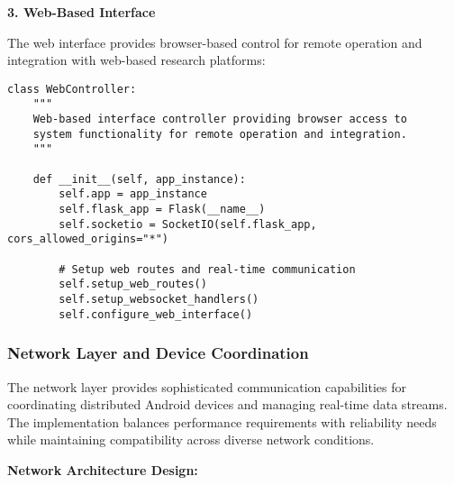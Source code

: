 \documentclass[12pt,a4paper]{article}
\begin{document}
\textbf{3. Web-Based Interface}

The web interface provides browser-based control for remote operation and integration with web-based research platforms:

\begin{verbatim}
class WebController:
    """
    Web-based interface controller providing browser access to
    system functionality for remote operation and integration.
    """
    
    def __init__(self, app_instance):
        self.app = app_instance
        self.flask_app = Flask(__name__)
        self.socketio = SocketIO(self.flask_app, cors_allowed_origins="*")
        
        # Setup web routes and real-time communication
        self.setup_web_routes()
        self.setup_websocket_handlers()
        self.configure_web_interface()
\end{verbatim}

\subsubsection{Network Layer and Device Coordination}

The network layer provides sophisticated communication capabilities for coordinating distributed Android devices and
managing real-time data streams. The implementation balances performance requirements with reliability needs while
maintaining compatibility across diverse network conditions.

\textbf{Network Architecture Design:}
\end{document}
